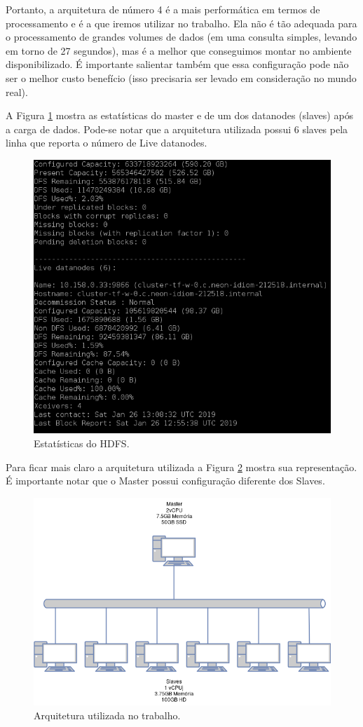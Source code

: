 \documentclass{article}
\begin{document}
Portanto, a arquitetura de número 4 é a mais performática em termos de processamento e é a que iremos utilizar no trabalho. Ela não é tão adequada para o processamento de grandes volumes de dados (em uma consulta simples, levando em torno de 27 segundos), mas é a melhor que conseguimos montar no ambiente disponibilizado. É importante salientar também que essa configuração pode não ser o melhor custo benefício (isso precisaria ser levado em consideração no mundo real).

A Figura \ref{fig:hdfs_data} mostra as estatísticas do master e de um dos datanodes (slaves) após a carga de dados. Pode-se notar que a arquitetura utilizada possui 6 slaves pela linha que reporta o número de Live datanodes.

\begin{figure}[H]
\centering
  \includegraphics[width=0.6 \linewidth]{img/hdfs-occupation.png}
  \caption{Estatísticas do HDFS.}
  \label{fig:hdfs_data}
\end{figure}

Para ficar mais claro a arquitetura utilizada a Figura \ref{fig:arch} mostra sua representação. É importante notar que o Master possui configuração diferente dos Slaves.

\begin{figure}[H]
\centering
  \includegraphics[width=0.6 \linewidth]{img/arch.png}
  \caption{Arquitetura utilizada no trabalho.}
  \label{fig:arch}
\end{figure}
\end{document}

